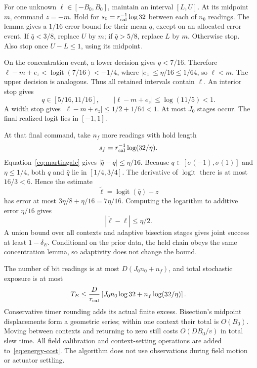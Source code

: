 \documentclass[11pt]{article}
\newcommand{\sig}{\sigma}
\DeclareMathOperator{\logit}{logit}
\begin{document}
For one unknown $\ell\in[-B_0,B_0]$, maintain an interval $[L,U]$. At its midpoint $m$, command $z=-m$. Hold for $s_0=r_{\rm cal}^{-1}\log32$ between each of $n_0$ readings. The lemma gives a $1/16$ error bound for their mean $\bar q$, except on an allocated error event. If $\bar q<3/8$, replace $U$ by $m$; if $\bar q>5/8$, replace $L$ by $m$. Otherwise stop. Also stop once $U-L\le1$, using its midpoint.

On the concentration event, a lower decision gives $q<7/16$. Therefore $\ell-m+e_z<\logit(7/16)<-1/4$, where $|e_z|\le\eta/16\le1/64$, so $\ell<m$. The upper decision is analogous. Thus all retained intervals contain $\ell$. An interior stop gives
\[
 q\in[5/16,11/16],\qquad |\ell-m+e_z|\le\log(11/5)<1.
\]
A width stop gives $|\ell-m+e_z|\le1/2+1/64<1$. At most $J_0$ stages occur. The final realized logit lies in $[-1,1]$.

At that final command, take $n_f$ more readings with hold length
\[
 s_f=r_{\rm cal}^{-1}\log(32/\eta).
\]
Equation~\eqref{eq:martingale} gives $|\bar q-q|\le\eta/16$. Because $q\in[\sig(-1),\sig(1)]$ and $\eta\le1/4$, both $q$ and $\bar q$ lie in $[1/4,3/4]$. The derivative of $\logit$ there is at most $16/3<6$. Hence the estimate
\[
 \widetilde\ell=\logit(\bar q)-z
\]
has error at most $3\eta/8+\eta/16=7\eta/16$. Computing the logarithm to additive error $\eta/16$ gives
\begin{equation}
 |\widetilde\ell-\ell|\le\eta/2.
 \label{eq:local-energy}
\end{equation}
A union bound over all contexts and adaptive bisection stages gives joint success at least $1-\delta_E$. Conditional on the prior data, the held chain obeys the same concentration lemma, so adaptivity does not change the bound.

The number of bit readings is at most $D(J_0n_0+n_f)$, and total stochastic exposure is at most
\begin{equation}
 T_E\le\frac D{r_{\rm cal}}
 \left[J_0n_0\log32+n_f\log(32/\eta)\right].
 \label{eq:energy-cost}
\end{equation}
Conservative timer rounding adds its actual finite excess. Bisection's midpoint displacements form a geometric series; within one context their total is $O(B_0)$. Moving between contexts and returning to zero still costs $O(DB_0/v)$ in total slew time. All field calibration and context-setting operations are added to~\eqref{eq:energy-cost}. The algorithm does not use observations during field motion or actuator settling.
\end{document}
